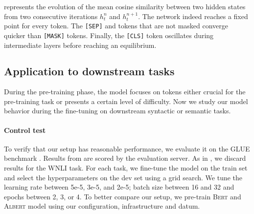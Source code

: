 


 represents the evolution of the mean cosine similarity between two hidden states from two consecutive iterations $h^n_t$ and $h^{n+1}_t$. The network indeed reaches a fixed point for every token. The \texttt{[SEP]} and tokens that are not masked converge quicker than \texttt{[MASK]} tokens. Finally, the \texttt{[CLS]} token oscillates during intermediate layers before reaching an equilibrium.

\subsection{Application to downstream tasks}

During the pre-training phase, the model focuses on tokens either crucial for the pre-training task or presents a certain level of difficulty. Now we study our model behavior during the fine-tuning on downstream syntactic or semantic tasks.


\paragraph{Control test} To verify that our setup has reasonable performance, we evaluate it on the GLUE benchmark \parencite{wang_19}.
Results from  are scored by the evaluation server. As in \textcite{devlin_19}, we discard results for the WNLI task. For each task, we fine-tune the model on the train set and select the hyperparameters on the dev set using a grid search. We tune the learning rate between 5e-5, 3e-5, and 2e-5; batch size between 16 and 32 and epochs between 2, 3, or 4. To better compare our setup, we pre-train \textsc{Bert} and \textsc{Albert} model using our configuration, infrastructure and datum.

